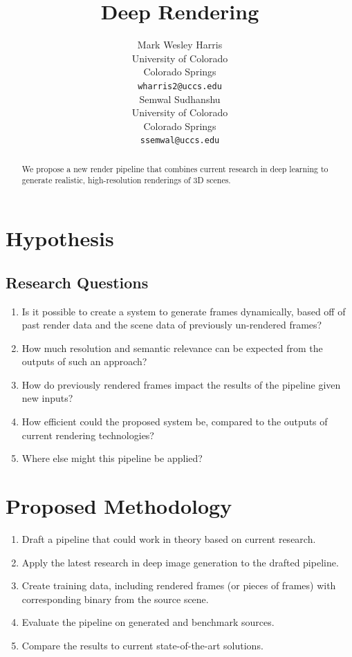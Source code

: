 \documentclass{article}
\title{Deep Rendering}
\author{Mark Wesley Harris\\
University of Colorado\\
Colorado Springs\\
\texttt{wharris2@uccs.edu} \\
\And
Semwal Sudhanshu\\
University of Colorado\\
Colorado Springs\\
\texttt{ssemwal@uccs.edu} \\
}
\begin{document}
\maketitle

\begin{abstract}
We propose a new render pipeline that combines current research in deep learning
to generate realistic, high-resolution renderings of 3D scenes.
\end{abstract}

\section{Hypothesis}
\label{sec:hypothesis}

\subsection{Research Questions}
\label{subsec:questions}
\begin{enumerate}
\item Is it possible to create a system to generate frames dynamically, based off of past render data and the scene data of previously un-rendered frames?
\item How much resolution and semantic relevance can be expected from the outputs of such an approach?
\item How do previously rendered frames impact the results of the pipeline given new inputs?
\item How efficient could the proposed system be, compared to the outputs of current rendering technologies?
\item Where else might this pipeline be applied?
\end{enumerate}

\section{Proposed Methodology}
\label{sec:methodology}
\begin{enumerate}
\item Draft a pipeline that could work in theory based on current research.
\item Apply the latest research in deep image generation to the drafted pipeline.
\item Create training data, including rendered frames (or pieces of frames) with corresponding binary from the source scene.
\item Evaluate the pipeline on generated and benchmark sources.
\item Compare the results to current state-of-the-art solutions.
\end{enumerate}
\end{document}
